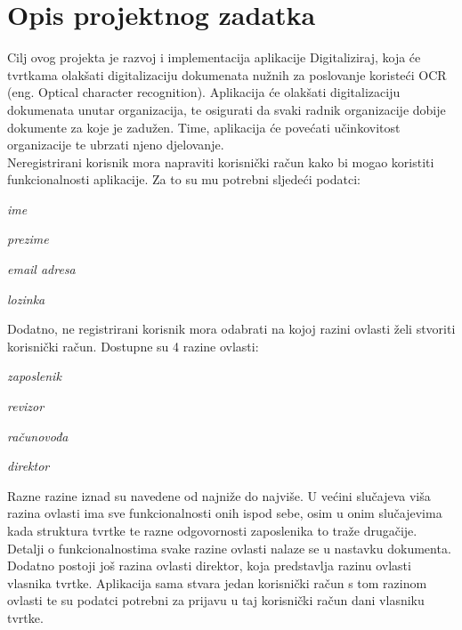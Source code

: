 \chapter{Opis projektnog zadatka}
		
		
		Cilj ovog projekta je razvoj i implementacija aplikacije Digitaliziraj, koja će tvrtkama olakšati digitalizaciju dokumenata nužnih za poslovanje koristeći OCR (eng. Optical character recognition). Aplikacija će olakšati digitalizaciju dokumenata unutar organizacija, te osigurati da svaki radnik organizacije dobije dokumente za koje je zadužen. Time, aplikacija će povećati učinkovitost organizacije te ubrzati njeno djelovanje.\\
		
		Neregistrirani korisnik mora napraviti korisnički račun kako bi mogao koristiti funkcionalnosti aplikacije. Za to su mu potrebni sljedeći podatci:
		
		\begin{packed_item}
			\item \textit{ime}
			\item \textit{prezime}
			\item \textit{email adresa}
			\item \textit{lozinka}
		\end{packed_item}
	
	Dodatno, ne registrirani korisnik mora odabrati na kojoj razini ovlasti želi stvoriti korisnički račun. Dostupne su 4 razine ovlasti:
	
	\begin{packed_item}
		\item \textit{zaposlenik}
		\item \textit{revizor}
		\item \textit{računovođa}
		\item \textit{direktor}
	\end{packed_item}
	
	Razne razine iznad su navedene od najniže do najviše. U većini slučajeva viša razina ovlasti ima sve funkcionalnosti onih ispod sebe, osim u onim slučajevima kada struktura tvrtke te razne odgovornosti zaposlenika to traže drugačije. Detalji o funkcionalnostima svake razine ovlasti nalaze se u nastavku dokumenta. Dodatno postoji još razina ovlasti direktor, koja predstavlja razinu ovlasti vlasnika tvrtke. Aplikacija sama stvara jedan korisnički račun s tom razinom ovlasti te su podatci potrebni za prijavu u taj korisnički račun dani vlasniku tvrtke.\\
	
